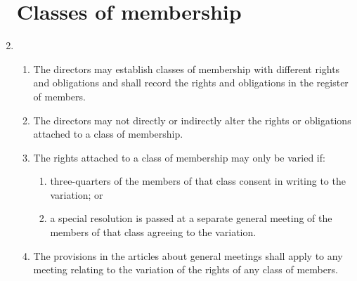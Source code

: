 \documentclass{article}
\begin{document}
\begin{enumerate}[label=\arabic*]
    \section{Classes of membership}
    \item \begin{enumerate}[label=(\arabic*)]
        \item The directors may establish classes of membership with
        different rights and obligations and shall record the rights and
        obligations in the register of members.
        \item The directors may not directly or indirectly alter the rights or
        obligations attached to a class of membership.
        \item The rights attached to a class of membership may only be
        varied if:
        \begin{enumerate}[label=(\alph*)]
            \item three-quarters of the members of that class consent in
            writing to the variation; or
            \item a special resolution is passed at a separate general meeting
            of the members of that class agreeing to the variation.
        \end{enumerate}
        \item The provisions in the articles about general meetings shall apply
        to any meeting relating to the variation of the rights of any class
        of members.
    \end{enumerate}
    

\end{enumerate}
\end{document}
